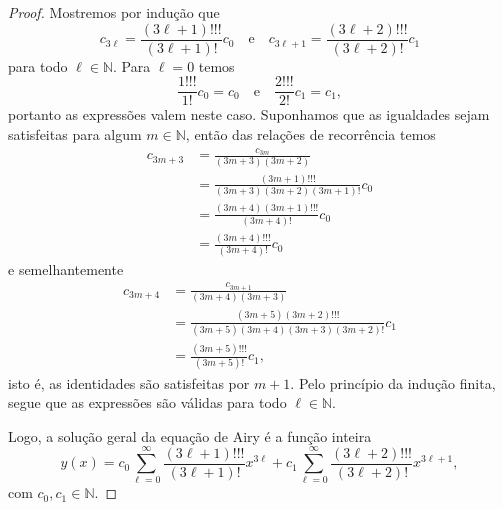 \begin{proof}
    Mostremos por indução que
    \begin{equation*}
        c_{3\ell} = \frac{(3\ell+1)!!!}{(3\ell+1)!}c_0\quad\text{e}\quad c_{3\ell + 1} = \frac{(3\ell + 2)!!!}{(3\ell+2)!}c_1
    \end{equation*}
    para todo \(\ell \in \mathbb{N}\). Para \(\ell = 0\) temos
    \begin{equation*}
        \frac{1!!!}{1!}c_0 = c_0\quad\text{e}\quad\frac{2!!!}{2!}c_1 = c_1,
    \end{equation*}
    portanto as expressões valem neste caso. Suponhamos que as igualdades sejam satisfeitas para algum \(m \in \mathbb{N}\), então das relações de recorrência temos
    \begin{align*}
        c_{3m + 3} &= \frac{c_{3m}}{(3m+3)(3m+2)} \\&= \frac{(3m + 1)!!!}{(3m+3)(3m+2)(3m + 1)!}c_0 \\&= \frac{(3m+4)(3m+1)!!!}{(3m+4)!}c_0 \\&= \frac{(3m+4)!!!}{(3m+4)!}c_0
    \end{align*}
    e semelhantemente
    \begin{align*}
        c_{3m + 4} &= \frac{c_{3m+1}}{(3m+4)(3m+3)} \\&= \frac{(3m+5)(3m + 2)!!!}{(3m+5)(3m+4)(3m+3)(3m + 2)!}c_1 \\&= \frac{(3m+5)!!!}{(3m+5)!}c_1,
    \end{align*}
    isto é, as identidades são satisfeitas por \(m + 1\). Pelo princípio da indução finita, segue que as expressões são válidas para todo \(\ell \in \mathbb{N}\).

    Logo, a solução geral da equação de Airy é a função inteira
    \begin{equation*}
        y(x) = c_0 \sum_{\ell = 0}^\infty\frac{(3\ell + 1)!!!}{(3\ell + 1)!}x^{3\ell} + c_1 \sum_{\ell = 0}^\infty\frac{(3\ell + 2)!!!}{(3\ell + 2)!}x^{3\ell + 1},
    \end{equation*}
    com \(c_0, c_1 \in \mathbb{N}\).
\end{proof}
